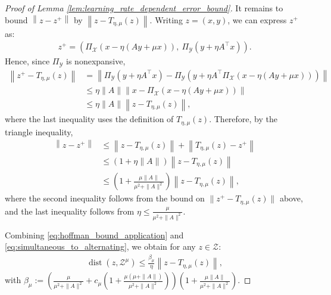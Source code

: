 \documentclass{article}
\DeclareMathOperator{\dist}{dist}
\newcommand{\X}{\mathcal{X}}
\newcommand{\Y}{\mathcal{Y}}
\newcommand{\Z}{\mathcal{Z}}
\theoremstyle{plain}
\begin{document}
\begin{proof}[Proof of Lemma \ref{lem:learning_rate_dependent_error_bound}]
    It remains to bound $\left\|z - z^+\right\|$ by $\left\|z - T_{\eta, \mu}(z)\right\|$.
    Writing $z = (x, y)$, we can express $z^+$ as:
    \begin{align*}
        z^+ = \left(\Pi_{\X}\left(x - \eta(Ay + \mu x)\right),~ \Pi_{\Y}\left(y + \eta A^{\top}x\right)\right).
    \end{align*}
    Hence, since $\Pi_{\Y}$ is nonexpansive,
    \begin{align*}
        \left\|z^+ - T_{\eta, \mu}(z)\right\|
        & = \left\|\Pi_{\Y}\left(y + \eta A^{\top}x\right) - \Pi_{\Y}\left(y + \eta A^{\top}\Pi_{\X}(x - \eta(Ay + \mu x))\right)\right\| \\
        & \leq \eta\|A\|\left\|x - \Pi_{\X}(x - \eta(Ay + \mu x))\right\|                                                                 \\
        & \leq \eta\|A\|\left\|z - T_{\eta, \mu}(z)\right\|,
    \end{align*}
    where the last inequality uses the definition of $T_{\eta, \mu}(z)$.
    Therefore, by the triangle inequality,
    \begin{align}
        \left\|z - z^+\right\|
        & \leq \left\|z - T_{\eta, \mu}(z)\right\| + \left\|T_{\eta, \mu}(z) - z^+\right\| \nonumber \\
        & \leq (1 + \eta\|A\|)\left\|z - T_{\eta, \mu}(z)\right\| \nonumber                          \\
        & \leq \left(1 + \frac{\mu\|A\|}{\mu^2 + \|A\|^2}\right)\left\|z - T_{\eta, \mu}(z)\right\|,
        \label{eq:simultaneous_to_alternating}
    \end{align}
    where the second inequality follows from the bound on $\|z^+ - T_{\eta, \mu}(z)\|$ above, and the last inequality follows from $\eta \leq \frac{\mu}{\mu^2 + \|A\|^2}$.

    Combining \eqref{eq:hoffman_bound_application} and \eqref{eq:simultaneous_to_alternating}, we obtain for any $z\in \Z$:
    \begin{align*}
        \dist(z, \Z^{\mu}) \leq \frac{\beta_{\mu}}{\eta}\left\|z - T_{\eta, \mu}(z)\right\|,
    \end{align*}
    with $\beta_{\mu} := \left(\frac{\mu}{\mu^2 + \|A\|^2} + c_{\mu}\left(1 + \frac{\mu (\mu + \|A\|)}{\mu^2 + \|A\|^2}\right)\right)\left(1 + \frac{\mu\|A\|}{\mu^2 + \|A\|^2}\right)$.
\end{proof}
\end{document}
